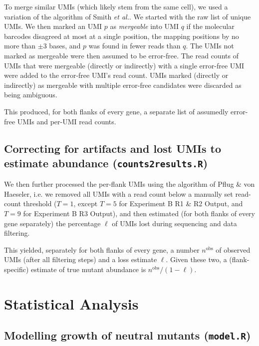 \documentclass[a4paper,11pt,oneside]{amsart}
\begin{document}
To merge similar UMIs (which likely stem from the same cell), we used a variation of the algorithm of Smith \textit{et al.}\cite{Smith2016}. We started with the raw list of unique UMIs. We then marked an UMI $p$ as \emph{mergeable} into UMI $q$ if the molecular barcodes disagreed at most at a single position, the mapping positions by no more than $\pm 3$ bases, and $p$ was found in fewer reads than $q$. The UMIs not marked as mergeable were then assumed to be error-free. The read counts of UMIs that were mergeable (directly or indirectly) with a single error-free UMI were added to the error-free UMI's read count. UMIs marked (directly or indirectly) as mergeable with multiple error-free candidates were discarded as being ambiguous.

This produced, for both flanks of every gene, a separate list of assumedly error-free UMIs and per-UMI read counts.

\subsection*{Correcting for artifacts and lost UMIs to estimate abundance (\texttt{counts2results.R}) }

We then further processed the per-flank UMIs using the algorithm of Pflug \& von Haeseler\cite{Pflug2017Preprint}, i.e. we removed all UMIs with a read count below a manually set read-count threshold ($T=1$, except $T=5$ for Experiment B R1 \& R2 Output, and $T=9$ for Experiment B R3 Output), and then estimated (for both flanks of every gene separately) the percentage $\ell$ of UMIs lost during sequencing and data filtering. 

This yielded, separately for both flanks of every gene, a number $n^\text{obs}$ of observed UMIs (after all filtering steps) and a loss estimate $\ell$. Given these two, a (flank-specific) estimate of true mutant abundance is $n^\text{obs} / (1-\ell)$.

\section{Statistical Analysis}

\subsection*{Modelling growth of neutral mutants (\texttt{model.R})}
\end{document}
